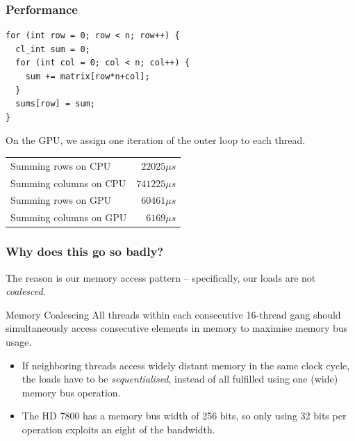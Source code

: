 \documentclass{beamer}
\begin{document}
\begin{frame}[fragile]
  \frametitle{Performance}

\begin{lstlisting}
for (int row = 0; row < n; row++) {
  cl_int sum = 0;
  for (int col = 0; col < n; col++) {
    sum += matrix[row*n+col];
  }
  sums[row] = sum;
}
\end{lstlisting}

On the GPU, we assign one iteration of the outer loop to each thread.

\bigskip

  \begin{tabular}{lr}
    Summing rows on CPU & $22025\mu{}s$ \\
    Summing columns on CPU & $741225\mu{}s$ \\
    Summing rows on GPU & $60461\mu{}s$ \\
    Summing columns on GPU & $6169\mu{}s$
  \end{tabular}

\end{frame}

\begin{frame}
  \frametitle{Why does this go so badly?}

  The reason is our memory access pattern -- specifically, our loads
  are not \textit{coalesced}.

  \begin{block}{Memory Coalescing}
    All threads within each consecutive 16-thread gang should
    simultaneously access consecutive elements in memory to maximise
    memory bus usage.
  \end{block}

  \begin{itemize}
  \item If neighboring threads access widely distant memory in the same
    clock cycle, the loads have to be \textit{sequentialised}, instead
    of all fulfilled using one (wide) memory bus operation.
  \item The HD 7800 has a memory bus width of 256 bits, so only using
    32 bits per operation exploits an eight of the bandwidth.
  \end{itemize}

\end{frame}
\end{document}
